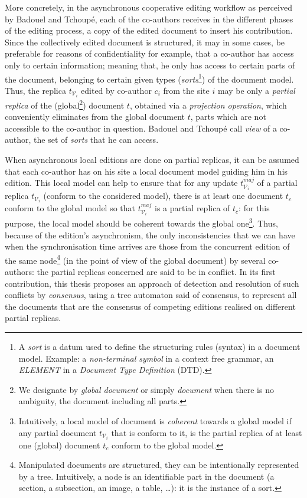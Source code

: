 More concretely, in the asynchronous cooperative editing workflow as perceived by Badouel and Tchoup\'e, each of the co-authors receives in the different phases of the editing process, a copy of the edited document to insert his contribution. 
Since the collectively edited document is structured, it may in some cases, be preferable for reasons of confidentiality for example, that a co-author has access only to certain information; meaning that, he only has access to certain parts of the document, belonging to certain given types (\textit{sorts}\footnote{A \textit{sort} is a datum used to define the structuring rules (syntax) in a document model. Example: a \textit{non-terminal symbol} in a context free grammar, an \textit{ELEMENT} in a \textit{Document Type Definition} (DTD).}) of the document model. Thus, the replica $t_{\mathcal{V}_i}$ edited by co-author $c_i$ from the site $i$ may be only a \textit{partial replica} of the (global\footnote{We designate by \textit{global document} or simply \textit{document} when there is no ambiguity, the document including all parts.}) document $t$, obtained via a \textit{projection operation}, which conveniently eliminates from the global document $t$, parts which are not accessible to the co-author in question. Badouel and Tchoup\'e call \textit{view} of a co-author, the set of \textit{sorts} that he can access. 

When asynchronous local editions are done on partial replicas, it can be assumed that each co-author has on his site a local document model guiding him in his edition. This local model can help to ensure that for any update $t_{\mathcal{V}_i}^{maj}$ of a partial replica $t_{\mathcal{V}_i}$ (conform to the considered model), there is at least one document $t_c$ conform to the global model so that $t_{\mathcal{V}_i}^{maj}$ is a partial replica of $t_c$: for this purpose, the local model should be coherent towards the global one\footnote{Intuitively, a local model of document is \textit{coherent} towards a global model if any partial document $t_{\mathcal{V}_i}$ that is conform to it, is the partial replica of at least one (global) document $t_c$ conform to the global model.}. Thus, because of the edition's asynchronism, the only inconsistencies that we can have when the synchronisation time arrives are those from the concurrent edition of the same node\footnote{Manipulated documents are structured, they can be intentionally represented by a tree. Intuitively, a node is an identifiable part in the document (a section, a subsection, an image, a table, \ldots): it is the instance of a sort.}  (in the point of view of the global document) by several co-authors: the partial replicas concerned are said to be in conflict. 
In its first contribution, this thesis proposes an approach of detection and resolution of such conflicts by \textit{consensus},
using a tree automaton said of consensus, to represent all the documents that are the consensus of competing editions realised on different partial replicas.

